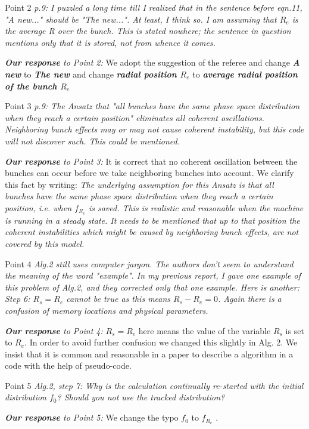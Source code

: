 \documentclass[10pt]{report}
\begin{document}
Point 2 
{\it p.9: I puzzled a long time till I realized that in the sentence before
eqn.11, "A new..." should be "The new...". At least, I think so. I am
assuming that $R_e$ is the average R over the bunch. This is stated
nowhere; the sentence in question mentions only that it is stored, not
from whence it comes. 
}

{\it {\bf Our response} to Point 2: }  We adopt the suggestion of the referee and change {\it {\bf A new} } to {\it {\bf The new }} 
and change {\it {\bf radial position $R_e$}} to {\it {\bf average radial position of the bunch $R_e$}}

Point 3
{\it p.9: The Ansatz that "all bunches have the same phase space distribution
when they reach a certain position" eliminates all coherent
oscillations. Neighboring bunch effects may or may not cause coherent
instability, but this code will not discover such. This could be
mentioned. }

{\it {\bf Our response} to Point 3: } It is correct that no coherent oscillation between the bunches can occur before
we take neighboring bunches into account. We clarify this fact by writing: 
{\it The underlying assumption for this Ansatz is that all bunches have the same phase space distribution when they reach a certain position, 
i.e. when $f_{R_{e}}$ is saved. This is realistic and reasonable when the machine is running in a steady state. 
It needs to be mentioned that up to that position the coherent instabilities which might be caused by neighboring bunch effects, 
are not covered by this model.}

Point 4
{\it Alg.2 still uses computer jargon. The authors don't seem to understand
the meaning of the word "example". In my previous report, I gave one
example of this problem of Alg.2, and they corrected only that one
example. Here is another: Step 6: $R_s=R_e$ cannot be true as this means
$R_s-R_e=0$. Again there is a confusion of memory locations and physical
parameters. }

{\it {\bf Our response} to Point 4: } $R_s=R_e$ here means the value of the variable $R_s$ is set to $R_e$.
In order to avoid further confusion we changed this slightly in Alg. 2.
We insist that it is common and reasonable in a paper to describe a algorithm in a code 
with the help of pseudo-code.

Point 5
{\it Alg.2, step 7: Why is the calculation continually re-started with the
initial distribution $f_0$? Should you not use the tracked distribution?}

{\it {\bf Our response} to Point 5: }
We change the typo $f_0$ to $f_{R_{e}}$ .
\end{document}
